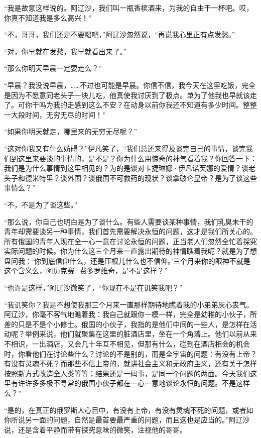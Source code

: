 \par “我是故意这样说的。阿辽沙，我们叫一瓶香槟酒来，为我的自由干一杯吧。哎，你真不知道我是多么高兴！”
\par “不，哥哥，我们还是不要喝吧，”阿辽沙忽然说，“再说我心里正有点发愁。”
\par “对，你早就在发愁，我早就看出来了。”
\par “那么你明天早晨一定要走么？”
\par “早晨？我没说早晨，……不过也可能是早晨。你信不信，我今天在这里吃饭，完全是因为不愿意同老头子一块儿吃，他真使我讨厌到了极点。单为了他我也早就该走了。可你干吗为我的走感到这么不安？在动身以前你我还不知道有多少时间。整整一大段时间，无穷无尽的时间！”
\par “如果你明天就走，哪里来的无穷无尽呢？”
\par “这对你我又有什么妨碍？”伊凡笑了，“我们总还来得及谈完自己的事情，谈完我们到这里来要谈的事情的，是不是？你为什么用惊奇的神气看着我？你回答一下：我们是为什么事情到这里相见的？为的是谈对卡捷琳娜·伊凡诺芙娜的爱情？谈老头子和德米特里？谈外国？谈俄国不可救药的现状？谈拿破仑皇帝？是为了谈这些事情么？”
\par “不，不是为了谈这些。”
\par “那么说，你自己也明白是为了谈什么。有些人需要谈某种事情，我们乳臭未干的青年却需要谈另一种事情，我们首先需要解决永恒的问题，这才是我们所关心的。所有俄国的青年人现在全一心一意在讨论永恒的问题，正当老人们忽然全忙着探究实际问题的时候。你为什么这三个月来一直露出期待的神情瞧着我呢？就是为了想盘问我：‘你到底信仰什么，还是压根儿什么也不信仰。’三个月来你的眼神不就是这个含义么，阿历克赛·费多罗维奇，是不是这样？”
\par “也许是这样，”阿辽沙微笑了，“你现在不是在讥笑我吧？”
\par “我讥笑你？我是不想使我那三个月来一直那样期待地瞧着我的小弟弟灰心丧气。阿辽沙，你毫不客气地瞧着我：我自己就跟你一模一样，完全是幼稚的小伙子，所差的只是不是个小修士。俄国的小伙子，我指的是他们中间的一些人，是怎样在活动呢？举例来说，他们就聚集在这里的脏酒店里，坐在一个角落上。他们以前从来不相识，一出酒店，又会几十年互不相见，但那有什么，碰到在酒店相会的机会时，你看他们在讨论些什么？讨论的不是别的，而是全宇宙的问题：有没有上帝？有没有灵魂不死？而那些不信上帝的，就讲社会主义和无政府主义，还有关于怎样按照新方式改造全人类等等；结果还是一码事，是同一个问题的两面。今天我们这里有许许多多极不寻常的俄国小伙子都在一心一意地谈论永恒的问题。不是这样么？”
\par “是的，在真正的俄罗斯人心目中，有没有上帝，有没有灵魂不死的问题，或者如你所说另一面的问题，自然是最首要最严重的问题，而且这也是应当的。”阿辽沙说，还是含着平静而带有探究意味的微笑，注视他的哥哥。

